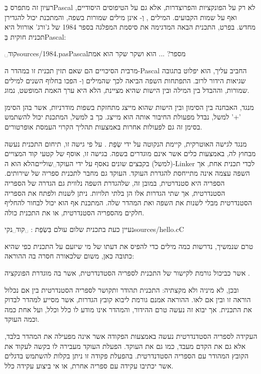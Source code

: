 רעיון זה מתפרס בְּPascal לא רק על הפונקציות והפרוצדרות, אלא גם על הטיפוסים היסודיים, ואף על שמות הקבועים. המילים ,  וְ- אינן מילים שמורות בשפה, והמתכנת יכול להגדירן מחדש. בפרט, התכנית הבאה המדגימה את סיסמת המפלגה בספר 1984 של ג'ורג' אורוול היא תכנית חוקית בְּPascal:

␣קוד{sources/1984.pas}{Pascal}{מספר? ... הוא ושקר שקר הוא אמת}

מרבית הסיכויים הם שאם תזין תכנית זו במהדר ה-Pascal החביב עליך, הוא יפלוט בתגובה שגיאות הידור לרוב. התפתחות השפה הביאה לכך שהמילים  וְ- הפכו בחלוף השנים למילים שמורות, וההבדל בין המילה  ובין הישות שהיא מציינת, הלא היא ערך האמת המופשט, נמוג.

מנגד, האבחנה בין הסימון ובין הישות שהוא מייצג מתחזקת בשפות מודרניות, אשר בהן הסימן '+' למשל, נבדל מפעולת החיבור אותה הוא מייצג. כך ב למשל, המתכנת יכול להשתמש בסימן זה גם לפעולות אחרות באמצעות תהליך הקרוי העמסת אופרטורים.

מנגד לגישה האוטרקית, קיימת  הנקוטה על ידי שְׂפַת . על פי גישה זו, תיחום התכנית נעשה מבחוץ לה, באמצעות כלים אשר אינם מוגדרים בשפה. בגישה זו, אוסף של קטעי קוד המצויים (למשל) בקבצים שונים נאסף על ידי העוקד␣שוליים{הלא הוא ה-Linker} לכדי תכנית אחת, אך השפה עצמה אינה מתייחסת להגדרת העוקד. העוקד גם מחבר לתכנית ספריה של שירותים. הספריה היא סטנדרטית, במובן זה, שלהגדרת השפה נלווית גם הגדרה של הספריה הסטנדרטית, אך שתי הגדרות אלו הן בלתי תלויות. ניתן לשנות ולפתח את הספריה הסטנדרטית מבלי לשנות את השפה ואת המהדר שלה. המתכנת אף הוא יכול לבחור להחליף חלקים מהספריה הסטנדרטית, או את התכנית כולה.

נעיין כעת בתכנית שלום עולם בִּשְׂפַת :
␣קוד␣נקי{sources/hello.c}{C}

טרם שנמשיך, נדרשות כמה מילים כדי להפיס את דעתו של מי שיזעם על התכנית כפי שהיא כתובה כאן, משום שלכאורה חסרה בה ההוראה:
\setLTR{}


\setRTL{}

אשר כביכול גורמת לקישור של התכנית לספריה הסטדנדרטית, אשר בה מוגדרת הפונקציה .

ובכן, לא מיניה ולא מקצתיה: התכנית תהודר ותקושר לספריה הסטנדרטית בין אם נכלול הוראה זו ובין אם לאו. ההוראה אמנם גורמת ליבוא קובץ הגדרות, אשר מסייע למהדר לבדוק את התכנית. אך יבוא זה נעשה טרם ההידור, והמהדר אינו מודע לו כלל וכלל, ועל אחת כמה וכמה העוקד.

העקידה לספריה הסטדנדרטית נעשה באמצעות הפקודה  אשר אינה מפעילה את המהדר בלבד, אלא גם את הקדם מעבד, כמו גם את העוקד. הפעלת העוקד מעבירה לו בקשה לעקוד את הקובץ המהודר עם הספריה הסטדנדרטית. בהפעלת פקודה זו ניתן בקלות להשתמש בדגלים אשר יכתיבו עקידה עם ספריה אחרת, או אי ביצוע עקידה כלל.

